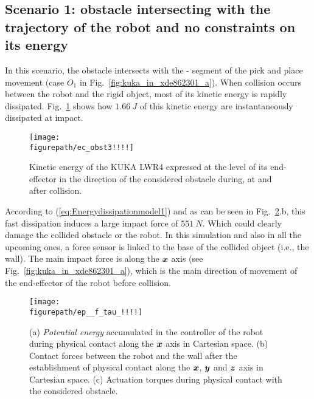 \subsection{Scenario 1: obstacle intersecting with the trajectory of the robot and no constraints on its energy} \label{subsec_no_constr_energy}
In this scenario, the obstacle intersects with the - segment of the pick and place movement (case $O_1$ in Fig.~\ref{fig:kuka_in_xde862301_a}). When collision occurs between the robot and the rigid object, most of its kinetic energy is rapidly dissipated. Fig.~\ref{fig:ec_obst3!!!!} shows how $1.66~J$ of this kinetic energy are instantaneously dissipated at impact. 
\begin{figure}[!htbp]
\centering
{\texttt{[image: \\figurepath/ec\_obst3!!!!]}}
\caption{Kinetic energy of the KUKA LWR4 expressed at the level of its end-effector in the direction of the considered obstacle during, at and after collision.} 
\label{fig:ec_obst3!!!!}
\end{figure}
According to (\ref{eq:Energydissipationmodel1}) and as can be seen in  Fig.~\ref{fig:ep__f_tau_!!!!}.b, this fast dissipation induces a large impact force of $551~N$. Which could clearly damage the collided obstacle or the robot. In this simulation and also in all the upcoming ones, a force sensor is linked to the base of the collided object (i.e., the wall). The main impact force is along the $\mbox{\boldmath${x}$}$ axis (see Fig.~\ref{fig:kuka_in_xde862301_a}), which is the main direction of movement of the end-effector of the robot before collision.
\begin{figure}[!htbp]
\centering
{\texttt{[image: \\figurepath/ep\_\_f\_tau\_!!!!]}}
\caption{(a) \textit{Potential energy} accumulated in the controller of the robot during physical contact along the $\mbox{\boldmath${x}$}$ axis in Cartesian space. (b) Contact forces between the robot and the wall after the establishment of physical contact along the $\mbox{\boldmath${x}$}$, $\mbox{\boldmath${y}$}$ and $\mbox{\boldmath${z}$}$ axis in Cartesian space. (c) Actuation torques during physical contact with the considered obstacle.} 
\label{fig:ep__f_tau_!!!!}
\end{figure}

